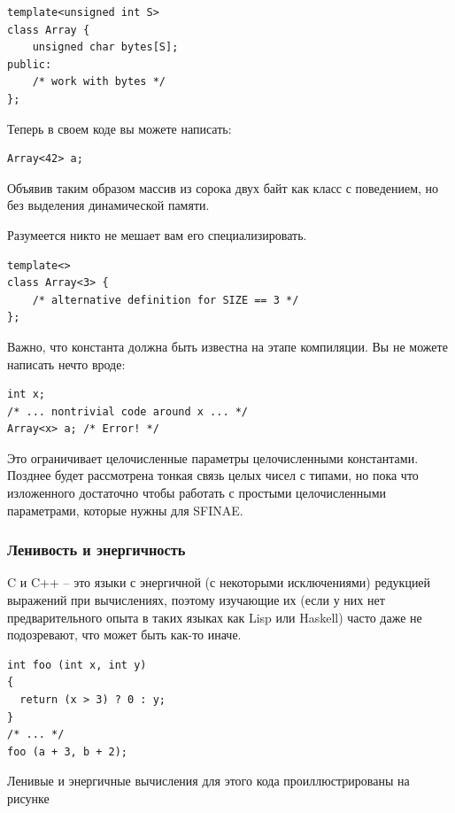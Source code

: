 \documentclass[a4paper,12pt,oneside]{article}
\begin{document}
\begin{lstlisting}
template<unsigned int S>
class Array {
    unsigned char bytes[S];
public:
    /* work with bytes */
};
\end{lstlisting}

Теперь в своем коде вы можете написать:

\begin{lstlisting}
Array<42> a;
\end{lstlisting}

Объявив таким образом массив из сорока двух байт как класс с поведением, но без выделения динамической памяти.

Разумеется никто не мешает вам его специализировать.

\begin{lstlisting}
template<>
class Array<3> {
    /* alternative definition for SIZE == 3 */
};
\end{lstlisting}

Важно, что константа должна быть известна на этапе компиляции. Вы не можете написать нечто вроде:

\begin{lstlisting}
int x;
/* ... nontrivial code around x ... */
Array<x> a; /* Error! */
\end{lstlisting}

Это ограничивает целочисленные параметры целочисленными константами. Позднее будет рассмотрена тонкая связь целых чисел с типами, но пока что изложенного достаточно чтобы работать с простыми целочисленными параметрами, которые нужны для SFINAE.

\subsubsection{Ленивость и энергичность}\label{Lazyness}

C и C++ -- это языки с энергичной (с некоторыми исключениями) редукцией выражений при вычислениях, поэтому изучающие их (если у них нет предварительного опыта в таких языках как Lisp или Haskell) часто даже не подозревают, что может быть как-то иначе.

\begin{lstlisting}
int foo (int x, int y)
{
  return (x > 3) ? 0 : y;
}
/* ... */
foo (a + 3, b + 2);
\end{lstlisting}

Ленивые и энергичные вычисления для этого кода проиллюстрированы на рисунке
\end{document}
